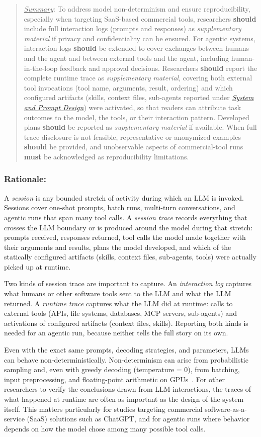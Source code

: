 \documentclass[smallextended]{svjour3}
\newcommand{\must}{\textbf{must}\xspace}
\newcommand{\should}{\textbf{should}\xspace}
\newcommand{\summary}{\underline{\emph{Summary}}\xspace}
\newcommand{\summary}{\textbf{\emph{Summary}}\xspace}
\newcommand{\supplementarymaterial}{\emph{supplementary material}\xspace}
\newcommand{\supplementarymaterial}{\emph{supplementary material}\xspace}
\newenvironment{framed}{\begin{quote}}{\end{quote}}
\newcommand{\design}{\hyperref[sec:report-system-and-prompt-design]{\emph{System and Prompt Design}}\xspace}
\newcommand{\design}{\href{/guidelines\#report-system-and-prompt-design}{\emph{System and Prompt Design}}\xspace}
\newcommand{\guidelinesubsubsection}[1]{\subsubsection{\bfseries #1:}}
\newcommand{\guidelinesubsubsection}[1]{\subsubsection{#1}}
\begin{document}
\vspace{0.5\baselineskip}
\begin{framed}
\summary: To address model non-determinism and ensure reproducibility, especially when targeting SaaS-based commercial tools, researchers \should include full interaction logs (prompts and responses) as \supplementarymaterial if privacy and confidentiality can be ensured. For agentic systems, interaction logs \should be extended to cover exchanges between humans and the agent and between external tools and the agent, including human-in-the-loop feedback and approval decisions. Researchers \should report the complete runtime trace as \supplementarymaterial, covering both external tool invocations (tool name, arguments, result, ordering) and which configured artifacts (skills, context files, sub-agents reported under \design) were activated, so that readers can attribute task outcomes to the model, the tools, or their interaction pattern. Developed plans \should be reported as \supplementarymaterial if available. When full trace disclosure is not feasible, representative or anonymized examples \should be provided, and unobservable aspects of commercial-tool runs \must be acknowledged as reproducibility limitations.
 \end{framed}

\guidelinesubsubsection{Rationale}

A \emph{session} is any bounded stretch of activity during which an LLM is invoked. Sessions cover one-shot prompts, batch runs, multi-turn conversations, and agentic runs that span many tool calls.
A \emph{session trace} records everything that crosses the LLM boundary or is produced around the model during that stretch: prompts received, responses returned, tool calls the model made together with their arguments and results, plans the model developed, and which of the statically configured artifacts (skills, context files, sub-agents, tools) were actually picked up at runtime.

Two kinds of session trace are important to capture.
An \emph{interaction log} captures what humans or other software tools sent to the LLM and what the LLM returned.
A \emph{runtime trace} captures what the LLM did at runtime: calls to external tools (APIs, file systems, databases, MCP servers, sub-agents) and activations of configured artifacts (context files, skills). Reporting both kinds is needed for an agentic run, because neither tells the full story on its own.

Even with the exact same prompts, decoding strategies, and parameters, LLMs can behave non-deterministically.
Non-determinism can arise from probabilistic sampling and, even with greedy decoding (temperature = 0), from batching, input preprocessing, and floating-point arithmetic on GPUs~\cite{Chann2023}.
For other researchers to verify the conclusions drawn from LLM interactions, the traces of what happened at runtime are often as important as the design of the system itself.
This matters particularly for studies targeting commercial software-as-a-service (SaaS) solutions such as ChatGPT, and for agentic runs where behavior depends on how the model chose among many possible tool calls.
\end{document}
